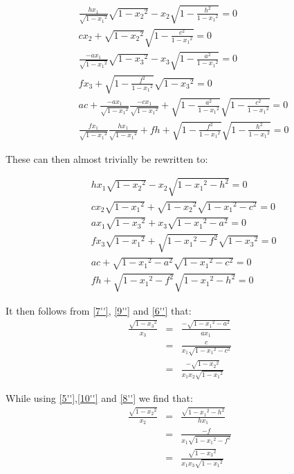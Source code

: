 \documentclass{report}
\begin{document}
\begin{align}
&\frac{h x_1}{\sqrt{1-{x_1}^2}}\sqrt{1-{x_2}^2} - x_2 \sqrt{1-\frac{h^2}{1-{x_1}^2}}=0 \tag{5'}\\
&cx_2 + \sqrt{1-{x_2}^2}\sqrt{1-\frac{c^2}{1-{x_1}^2}}=0 \tag{6'}\\
&\frac{-a x_1}{\sqrt{1-{x_1}^2}}\sqrt{1-{x_3}^2} - x_3 \sqrt{1-\frac{a^2}{1-{x_1}^2}}=0\tag{7'}\\
&fx_3 + \sqrt{1-\frac{f^2}{1-{x_1}^2}}\sqrt{1-{x_3}^2}=0\tag{8'}\\
&ac + \frac{-a x_1}{\sqrt{1-{x_1}^2}}\frac{-c x_1}{\sqrt{1-{x_1}^2}} + \sqrt{1-\frac{a^2}{1-{x_1}^2}}\sqrt{1-\frac{c^2}{1-{x_1}^2}} = 0 \tag{9'}\\
&\frac{f x_1}{\sqrt{1-{x_1}^2}}\frac{h x_1}{\sqrt{1-{x_1}^2}} + fh + \sqrt{1-\frac{f^2}{1-{x_1}^2}}\sqrt{1-\frac{h^2}{1-{x_1}^2}} = 0\tag{10'}
\end{align}

These can then almost trivially be rewritten to:

\begin{align}
&h x_1\sqrt{1-{x_2}^2} - x_2 \sqrt{1-{x_1}^2 - h^2}=0 \tag{5''}\label{5''}\\
&cx_2\sqrt{1-{x_1}^2} + \sqrt{1-{x_2}^2}\sqrt{1-{x_1}^2 - c^2}=0\tag{6''}\label{6''}\\
&a x_1\sqrt{1-{x_3}^2} + x_3 \sqrt{1-{x_1}^2 - a^2}=0\tag{7''}\label{7''}\\
&fx_3\sqrt{1-{x_1}^2} + \sqrt{1-{x_1}^2 - f^2}\sqrt{1-{x_3}^2}=0\tag{8''}\label{8''}\\
&ac + \sqrt{1- {x_1}^2 - a^2}\sqrt{1- {x_1}^2 - c^2} = 0\tag{9''}\label{9''}\\
&fh + \sqrt{1- {x_1}^2 - f^2}\sqrt{1- {x_1}^2 - h^2} = 0\tag{10''}\label{10''}
\end{align}

It then follows from \eqref{7''}, \eqref{9''} and \eqref{6''} that:
\begin{eqnarray*}
\frac{\sqrt{1-{x_3}^2}}{x_3} &=& \frac{-\sqrt{1-{x_1}^2 - a^2}}{ax_1}\\
&=& \frac{c}{x_1 \sqrt{1-{x_1}^2 -c^2}}\\
&=& \frac{-\sqrt{1-{x_2}^2}}{x_1 x_2 \sqrt{1-{x_1}^2}}
\end{eqnarray*}

While using \eqref{5''},\eqref{10''} and \eqref{8''} we find that:
\begin{eqnarray*}
\frac{\sqrt{1-{x_2}^2}}{x_2} &=& \frac{\sqrt{1-{x_1}^2 - h^2}}{hx_1}\\
&=& \frac{-f}{x_1 \sqrt{1-{x_1}^2 -f^2}}\\
&=& \frac{\sqrt{1-{x_3}^2}}{x_1 x_3 \sqrt{1-{x_1}^2}}
\end{eqnarray*}
\end{document}
